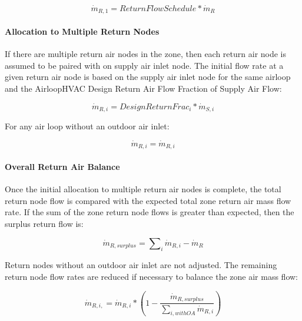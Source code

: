 \begin{equation}
{\dot m_{R,1}} = ReturnFlowSchedule*{\dot m_{R}}
\end{equation}

\paragraph{Allocation to Multiple Return Nodes}\label{allocation-to-multiple-return-nodes}

If there are multiple return air nodes in the zone, then each return air node is assumed to be paired with on supply air inlet node. The initial flow rate at a given return air node is based on the supply air inlet node for the same airloop and the AirloopHVAC Design Return Air Flow Fraction of Supply Air Flow:

\begin{equation}
{\dot m_{R,i}} = {DesignReturnFrac_i} * {\dot m_{S,i}}
\end{equation}

For any air loop without an outdoor air inlet:

\begin{equation}
{\dot m_{R,i}} = {\dot m_{R,i}}
\end{equation}

\paragraph{Overall Return Air Balance}\label{overall-return-air-balance}

Once the initial allocation to multiple return air nodes is complete, the total return node flow is compared with the expected total zone return air mass flow rate. If the sum of the zone return node flows is greater than expected, then the surplus return flow is:

\begin{equation}
{\dot m_{R,surplus}} = \sum\nolimits_i {{{\dot m}_{R,i}}} - {\dot m_{R}}
\end{equation}

Return nodes without an outdoor air inlet are not adjusted. The remaining return node flow rates are reduced if necessary to balance the zone air mass flow:

\begin{equation}
{\dot m_{R,i,}} = {\dot m_{R,i}} * \left( 1 - \frac{\dot m_{R,surplus}} {\sum\nolimits_{i,withOA} {{{\dot m}_{R,i}}}} \right) 
\end{equation}


